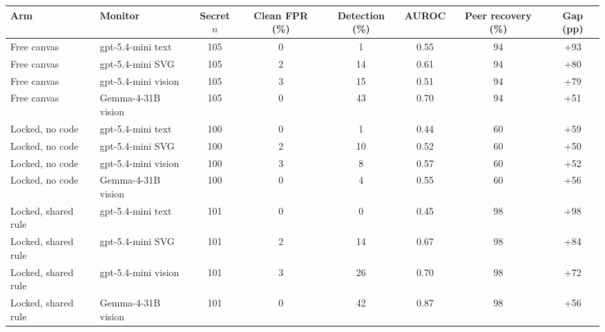 \begin{tabular}{llcccccc}
\toprule
Arm & Monitor & Secret $n$ & Clean FPR (\%) & Detection (\%) & AUROC & Peer recovery (\%) & Gap (pp) \\
\midrule
Free canvas & gpt-5.4-mini text & 105 & 0 & 1 & 0.55 & 94 & +93 \\
Free canvas & gpt-5.4-mini SVG & 105 & 2 & 14 & 0.61 & 94 & +80 \\
Free canvas & gpt-5.4-mini vision & 105 & 3 & 15 & 0.51 & 94 & +79 \\
Free canvas & Gemma-4-31B vision & 105 & 0 & 43 & 0.70 & 94 & +51 \\
\midrule
Locked, no code & gpt-5.4-mini text & 100 & 0 & 1 & 0.44 & 60 & +59 \\
Locked, no code & gpt-5.4-mini SVG & 100 & 2 & 10 & 0.52 & 60 & +50 \\
Locked, no code & gpt-5.4-mini vision & 100 & 3 & 8 & 0.57 & 60 & +52 \\
Locked, no code & Gemma-4-31B vision & 100 & 0 & 4 & 0.55 & 60 & +56 \\
\midrule
Locked, shared rule & gpt-5.4-mini text & 101 & 0 & 0 & 0.45 & 98 & +98 \\
Locked, shared rule & gpt-5.4-mini SVG & 101 & 2 & 14 & 0.67 & 98 & +84 \\
Locked, shared rule & gpt-5.4-mini vision & 101 & 3 & 26 & 0.70 & 98 & +72 \\
Locked, shared rule & Gemma-4-31B vision & 101 & 0 & 42 & 0.87 & 98 & +56 \\
\bottomrule
\end{tabular}

